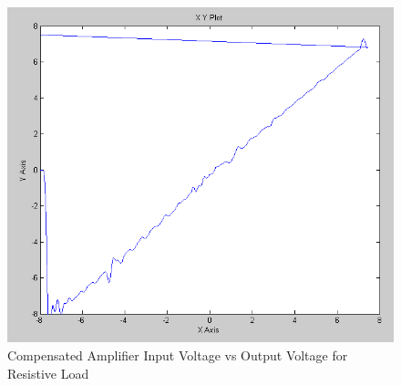 \begin{figure}[ht]
    \centering
    \includegraphics[width=.70\textwidth]{images/CompensatedOutput.PNG}
    \caption{Compensated Amplifier Input Voltage vs Output Voltage for Resistive Load}
    \label{fig:iocomp}
\end{figure}
